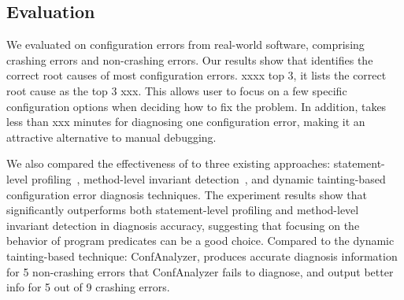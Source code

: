 
 









\subsection{Evaluation}

We evaluated \ourtool on \errors configuration errors
from \subjectnum real-world software, comprising
\crash crashing errors and \noncrash non-crashing errors.
Our results show that \ourtool identifies the correct
root causes of most configuration errors. xxxx top 3,
it lists the correct root cause as the top 3 xxx.
This allows \ourtool user to focus on a few specific configuration
options when deciding how to fix the problem. 
In addition, \ourtool takes less than xxx minutes for diagnosing
one configuration error, making it an attractive alternative
to manual debugging.

We also compared the effectiveness of \ourtool to
three existing approaches: statement-level profiling~\cite{}, method-level
invariant detection~\cite{}, and dynamic tainting-based configuration
error diagnosis techniques. The experiment results show that
\ourtool significantly outperforms both statement-level profiling
and method-level invariant detection in diagnosis accuracy, suggesting
that focusing on the behavior of program predicates can be a
good choice. Compared to the dynamic tainting-based technique: ConfAnalyzer, \ourtool
produces accurate diagnosis information for 5 non-crashing errors that
ConfAnalyzer fails to diagnose, and output better info for 5 out of 9
crashing errors. 

